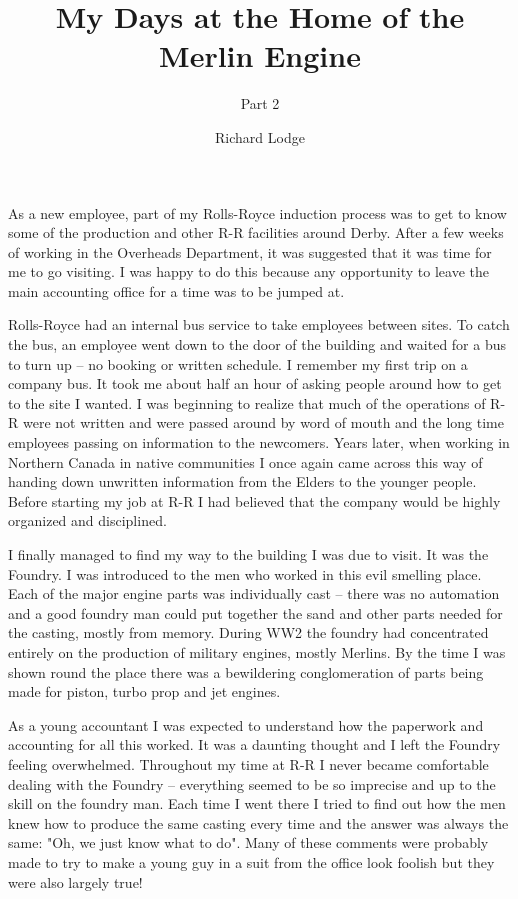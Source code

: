 %


\title{My Days at the Home of the Merlin Engine}
\subtitle{Part 2}
\author{Richard Lodge}

\maketitle

As a new employee, part of my Rolls-Royce induction process was to get
to know some of the production and other R-R facilities around
Derby. After a few weeks of working in the Overheads Department, it
was suggested that it was time for me to go visiting. I was happy to
do this because any opportunity to leave the main accounting office
for a time was to be jumped at.

Rolls-Royce had an internal bus service to take employees between
sites. To catch the bus, an employee went down to the door of the
building and waited for a bus to turn up -- no booking or written
schedule.  I remember my first trip on a company bus. It took me about
half an hour of asking people around how to get to the site I
wanted. I was beginning to realize that much of the operations of R-R
were not written and were passed around by word of mouth and the long
time employees passing on information to the newcomers. Years later,
when working in Northern Canada in native communities I once again
came across this way of handing down unwritten information from the
Elders to the younger people. Before starting my job at R-R I had
believed that the company would be highly organized and disciplined.

I finally managed to find my way to the building I was due to visit.
It was the Foundry. I was introduced to the men who worked in this
evil smelling place. Each of the major engine parts was individually
cast -- there was no automation and a good foundry man could put
together the sand and other parts needed for the casting, mostly from
memory. During WW2 the foundry had concentrated entirely on the
production of military engines, mostly Merlins.  By the time I was
shown round the place there was a bewildering conglomeration of parts
being made for piston, turbo prop and jet engines.

As a young accountant I was expected to understand how the paperwork
and accounting for all this worked. It was a daunting thought and I
left the Foundry feeling overwhelmed.  Throughout my time at R-R I
never became comfortable dealing with the Foundry -- everything seemed
to be so imprecise and up to the skill on the foundry man. Each time I
went there I tried to find out how the men knew how to produce the
same casting every time and the answer was always the same: "Oh, we
just know what to do".  Many of these comments were probably made to
try to make a young guy in a suit from the office look foolish but
they were also largely true!

